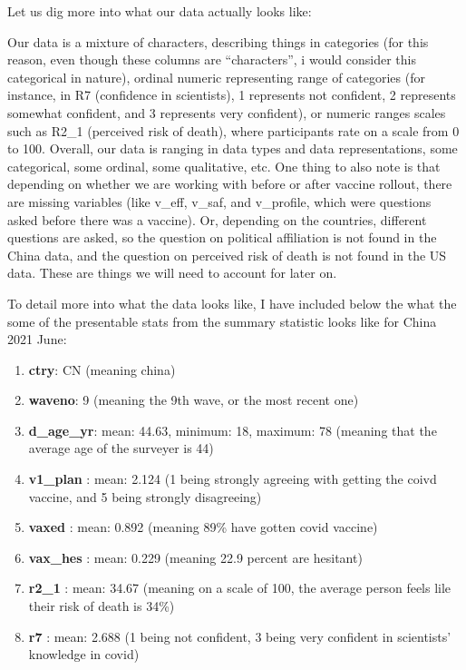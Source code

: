 \documentclass[
]{article}
\providecommand{\tightlist}{%
  \setlength{\itemsep}{0pt}\setlength{\parskip}{0pt}}
\begin{document}
Let us dig more into what our data actually looks like:

Our data is a mixture of characters, describing things in categories
(for this reason, even though these columns are ``characters'', i would
consider this categorical in nature), ordinal numeric representing range
of categories (for instance, in R7 (confidence in scientists), 1
represents not confident, 2 represents somewhat confident, and 3
represents very confident), or numeric ranges scales such as R2\_1
(perceived risk of death), where participants rate on a scale from 0 to
100. Overall, our data is ranging in data types and data
representations, some categorical, some ordinal, some qualitative, etc.
One thing to also note is that depending on whether we are working with
before or after vaccine rollout, there are missing variables (like
v\_eff, v\_saf, and v\_profile, which were questions asked before there
was a vaccine). Or, depending on the countries, different questions are
asked, so the question on political affiliation is not found in the
China data, and the question on perceived risk of death is not found in
the US data. These are things we will need to account for later on.

To detail more into what the data looks like, I have included below the
what the some of the presentable stats from the summary statistic looks
like for China 2021 June:

\begin{enumerate}
\def\labelenumi{\arabic{enumi}.}
\tightlist
\item
  \textbf{ctry}: CN (meaning china)
\item
  \textbf{waveno}: 9 (meaning the 9th wave, or the most recent one)
\item
  \textbf{d\_age\_yr}: mean: 44.63, minimum: 18, maximum: 78 (meaning
  that the average age of the surveyer is 44)
\item
  \textbf{v1\_plan} : mean: 2.124 (1 being strongly agreeing with
  getting the coivd vaccine, and 5 being strongly disagreeing)
\item
  \textbf{vaxed} : mean: 0.892 (meaning 89\% have gotten covid vaccine)
\item
  \textbf{vax\_hes} : mean: 0.229 (meaning 22.9 percent are hesitant)
\item
  \textbf{r2\_1} : mean: 34.67 (meaning on a scale of 100, the average
  person feels lile their risk of death is 34\%)
\item
  \textbf{r7} : mean: 2.688 (1 being not confident, 3 being very
  confident in scientists' knowledge in covid)
\end{enumerate}
\end{document}
